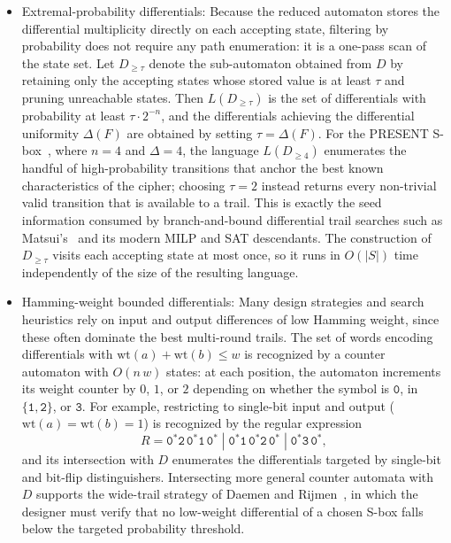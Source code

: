 \begin{itemize}
    \item Extremal-probability differentials: Because the reduced
          automaton stores the differential multiplicity directly on
          each accepting state, filtering by probability does not
          require any path enumeration: it is a one-pass scan of the
          state set. Let $D_{\geq \tau}$ denote the sub-automaton
          obtained from $D$ by retaining only the accepting states
          whose stored value is at least $\tau$ and pruning unreachable
          states. Then $L(D_{\geq \tau})$ is the set of differentials
          with probability at least $\tau \cdot 2^{-n}$, and the
          differentials achieving the differential uniformity
          $\Delta(F)$ are obtained by setting $\tau = \Delta(F)$. For
          the PRESENT S-box~\cite{BogdanovEtAl2007}, where $n = 4$ and $\Delta = 4$, the
          language $L(D_{\geq 4})$ enumerates the handful of
          high-probability transitions that anchor the best known
          characteristics of the cipher; choosing $\tau = 2$ instead
          returns every non-trivial valid transition that is available
          to a trail. This is exactly the seed information consumed by
          branch-and-bound differential trail searches such as
          Matsui's~\cite{Matsui1995} and its modern MILP and SAT descendants. The
          construction of $D_{\geq \tau}$ visits each accepting state
          at most once, so it runs in $O(|S|)$ time independently of
          the size of the resulting language.

    \item Hamming-weight bounded differentials: Many design strategies and
          search heuristics rely on input and output differences of low
          Hamming weight, since these often dominate the best multi-round
          trails. The set of words encoding differentials with
          $\mathrm{wt}(a) + \mathrm{wt}(b) \leq w$ is recognized by a
          counter automaton with $O(n\,w)$ states: at each position, the
          automaton increments its weight counter by $0$, $1$, or $2$
          depending on whether the symbol is $\texttt{0}$, in
          $\{\texttt{1},\texttt{2}\}$, or $\texttt{3}$.
          For example, restricting to single-bit input and output
          ($\mathrm{wt}(a) = \mathrm{wt}(b) = 1$) is recognized by the
          regular expression
          \[
              R = \texttt{0}^{*}\texttt{2}\,\texttt{0}^{*}\texttt{1}\,\texttt{0}^{*}\;|\;
                  \texttt{0}^{*}\texttt{1}\,\texttt{0}^{*}\texttt{2}\,\texttt{0}^{*}\;|\;
                  \texttt{0}^{*}\texttt{3}\,\texttt{0}^{*},
          \]
          and its intersection with $D$ enumerates the differentials
          targeted by single-bit and bit-flip distinguishers.
          Intersecting more general counter automata with $D$ supports
          the wide-trail strategy of Daemen and Rijmen~\cite{DaemenRijmen2002}, in which
          the designer must verify that no low-weight differential of a
          chosen S-box falls below the targeted probability threshold.


\end{itemize}
